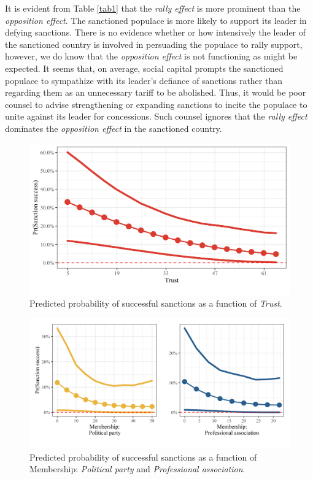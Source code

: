 \documentclass[12pt,]{article}
\begin{document}
It is evident from Table \ref{tab1} that the \emph{rally effect} is more
prominent than the \emph{opposition effect}. The sanctioned populace is
more likely to support its leader in defying sanctions. There is no
evidence whether or how intensively the leader of the sanctioned country
is involved in persuading the populace to rally support, however, we do
know that the \emph{opposition effect} is not functioning as might be
expected. It seems that, on average, social capital prompts the
sanctioned populace to sympathize with its leader's defiance of
sanctions rather than regarding them as an unnecessary tariff to be
abolished. Thus, it would be poor counsel to advise strengthening or
expanding sanctions to incite the populace to unite against its leader
for concessions. Such counsel ignores that the \emph{rally effect}
dominates the \emph{opposition effect} in the sanctioned country.

\begin{figure}

{\centering \includegraphics[width=0.65\linewidth]{figures/figure2} 

}

\caption{\label{fig2} Predicted probability of successful sanctions as a function of \textit{Trust}.}\label{fig:unnamed-chunk-3}
\end{figure}
\begin{figure}

{\centering \includegraphics[width=0.65\linewidth]{figures/figure3} 

}

\caption{\label{fig3} Predicted probability of successful sanctions as a function of Membership: \textit{Political party} and \textit{Professional association}.}\label{fig:unnamed-chunk-4}
\end{figure}
\end{document}
